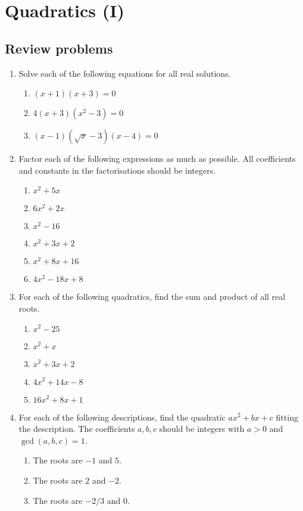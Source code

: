 \section{Quadratics (I)}

\subsection{Review problems}

\begin{enumerate}
\item Solve each of the following equations for all real solutions.
\begin{enumerate}
\item $(x + 1)(x + 3) = 0$
\item $4(x + 3)(x^2 - 3) = 0$
\item $(x - 1)(\sqrt{x} - 3)(x - 4) = 0$
\end{enumerate}
\item Factor each of the following expressions as much as possible. All coefficients and constants in the factorisations should be integers.
\begin{enumerate}
\item $x^2 + 5x$
\item $6x^2 + 2x$
\item $x^2 - 16$
\item $x^2 + 3x + 2$
\item $x^2 + 8x + 16$
\item $4x^2 - 18x + 8$
\end{enumerate}
\item For each of the following quadratics, find the sum and product of all real roots.
\begin{enumerate}
\item $x^2 - 25$
\item $x^2 + x$
\item $x^2 + 3x + 2$
\item $4x^2 + 14x - 8$
\item $16x^2 + 8x + 1$
\end{enumerate} 
\item For each of the following descriptions, find the quadratic $ax^2 + bx + c$ fitting the description. The coefficients $a,b,c$ should be integers with $a > 0$ and $\gcd(a,b,c) = 1$.
\begin{enumerate}
\item The roots are $-1$ and $5$.
\item The roots are $2$ and $-2$.
\item The roots are $-2/3$ and $0$.

\end{enumerate}
\end{enumerate}
